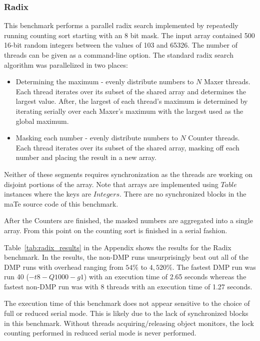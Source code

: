 \subsubsection{Radix}

This benchmark performs a parallel radix search implemented by
repeatedly running counting sort starting with an 8 bit mask.  The
input array contained 500 16-bit random integers between the values of
103 and 65326.  The number of threads can be given as a command-line
option.  The standard radix search algorithm was parallelized in two
places:

\begin{itemize}
\item Determining the maximum - evenly distribute numbers to $N$ Maxer
  threads.  Each thread iterates over its subset of the shared array
  and determines the largest value.  After, the largest of each
  thread's maximum is determined by iterating serially over each
  Maxer's maximum with the largest used as the global maximum.

\item Masking each number - evenly distribute numbers to $N$ Counter
  threads.  Each thread iterates over its subset of the shared array,
  masking off each number and placing the result in a new array.
\end{itemize}

Neither of these segments requires synchronization as the threads are
working on disjoint portions of the array.  Note that arrays are
implemented using $Table$ instances where the keys are $Integers$.
There are no synchronized blocks in the maTe source code of this
benchmark.

After the Counters are finished, the masked numbers are aggregated
into a single array.  From this point on the counting sort is finished
in a serial fashion.

Table~\ref{tab:radix_results} in the Appendix shows the results for
the Radix benchmark.  In the results, the non-DMP runs unsurprisingly
beat out all of the DMP runs with overhead ranging from $54\%$ to
$4,520\%$.  The fastest DMP run was run 40 ($-t8 -Q1000 -g1$) with an
execution time of 2.65 seconds whereas the fastest non-DMP run was
with 8 threads with an execution time of 1.27 seconds.

The execution time of this benchmark does not appear sensitive to the
choice of full or reduced serial mode.  This is likely due to the lack
of synchronized blocks in this benchmark.  Without threads
acquiring/releasing object monitors, the lock counting performed in
reduced serial mode is never performed.

